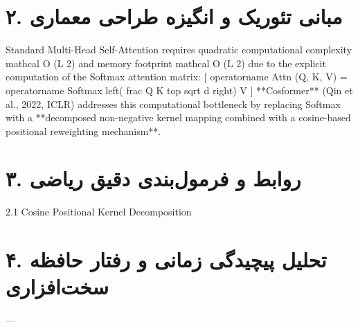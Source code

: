 \documentclass[12pt,a4paper]{article}
\begin{document}
\section*{۲. مبانی تئوریک و انگیزه طراحی معماری}
Standard Multi-Head Self-Attention requires quadratic computational complexity mathcal O (L 2) and memory footprint mathcal O (L 2) due to the explicit computation of the Softmax attention matrix: [ operatorname Attn (Q, K, V) = operatorname Softmax left( frac Q K top sqrt d right) V ] **Cosformer** (Qin et al., 2022, ICLR) addresses this computational bottleneck by replacing Softmax with a **decomposed non-negative kernel mapping combined with a cosine-based positional reweighting mechanism**.

\section*{۳. روابط و فرمول‌بندی دقیق ریاضی}
2.1 Cosine Positional Kernel Decomposition

\section*{۴. تحلیل پیچیدگی زمانی و رفتار حافظه سخت‌افزاری}
---
\end{document}
